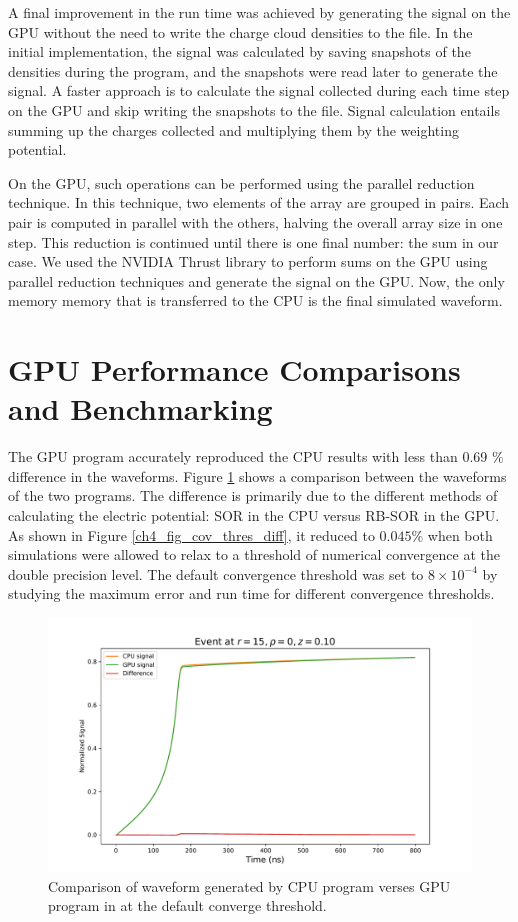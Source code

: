 A final improvement in the run time was achieved by generating the signal on the GPU without the need to write the charge cloud densities to the file. In the initial implementation, the signal was calculated by saving snapshots of the densities during the program, and the snapshots were read later to generate the signal. A faster approach is to calculate the signal collected during each time step on the GPU and skip writing the snapshots to the file. Signal calculation entails summing up the charges collected and multiplying them by the weighting potential. 

On the GPU, such operations can be performed using the parallel reduction technique. In this technique, two elements of the array are grouped in pairs. Each pair is computed in parallel with the others, halving the overall array size in one step. This reduction is continued until there is one final number: the sum in our case. We used the NVIDIA Thrust library to perform sums on the GPU using parallel reduction techniques and generate the signal on the GPU. Now, the only memory memory that is transferred to the CPU is the final simulated waveform.

\section{GPU Performance Comparisons and Benchmarking}

The GPU program accurately reproduced the CPU results with less than 0.69 $\%$ difference in the waveforms. Figure \ref{ch4_fig_waveform_comp} shows a comparison between the waveforms of the two programs.  The difference is primarily due to the different methods of calculating the electric potential: SOR in the CPU versus RB-SOR in the GPU. As shown in Figure \ref{ch4_fig_cov_thres_diff}, it reduced to $0.045\%$ when both simulations were allowed to relax to a threshold of numerical convergence at the double precision level. The default convergence threshold was set to $8\times10^{-4}$ by studying the maximum error and run time for different convergence thresholds.

\begin{figure}[!ht]
\centering
 \includegraphics[width=0.99\linewidth]{ch4/figs/cpu_gpu_wf.pdf}
\caption{Comparison of waveform generated by CPU program verses GPU program in {\ehd} at the default converge threshold.}
\label{ch4_fig_waveform_comp}
\end{figure}

